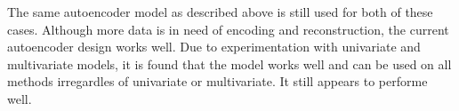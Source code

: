 The same autoencoder model as described above is still used for both of these cases.
Although more data is in need of encoding and reconstruction,
the current autoencoder design works well.
Due to experimentation with univariate and multivariate models,
it is found that the model works well and can be used on all methods irregardles of univariate or multivariate.
It still appears to performe well.




